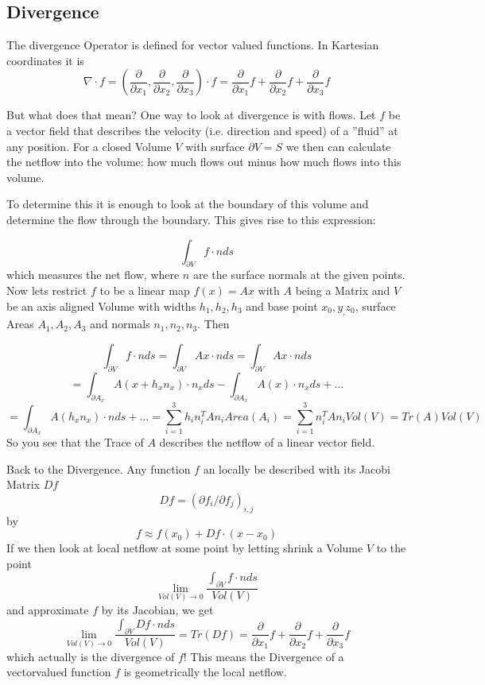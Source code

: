 \subsection{Divergence}

The divergence Operator is defined for vector valued functions. In Kartesian coordinates it is 
\[\nabla \cdot f = (\frac{ \partial}{\partial x_1},\frac{ \partial}{\partial x_2},\frac{ \partial}{\partial x_3})\cdot f = \frac{ \partial}{\partial x_1} f + \frac{ \partial}{\partial x_2}f + \frac{ \partial}{\partial x_3}f\]

But what does that mean? One way to look at divergence is with flows. Let $f$ be a vector field that describes the velocity (i.e. direction and speed) of a ''fluid'' at any position. For a closed Volume $V$ with surface $\partial V = S$ we then can calculate the netflow into the volume: how much flows out minus how much flows into this volume.

To determine this it is enough to look at the boundary of this volume and determine the flow through the boundary. This gives rise to this expression:

\[\int_{\partial V} f \cdot n ds\]
which measures the net flow, where $n$ are the surface normals at the given points. Now lets restrict $f$ to be a linear map $f(x) = A x$ with $A$ being a Matrix and $V$ be an axis aligned Volume with widths $h_1,h_2,h_3$ and base point $x_0,y_,z_0$, surface Areas $A_1, A_2, A_3$ and normals $n_1,n_2,n_3$. Then

\[\int_{\partial V} f \cdot n ds = \int_{\partial V} Ax \cdot n ds = \int_{\partial V} Ax \cdot n ds\]
\[= \int_{\partial A_x} A(x + h_xn_x) \cdot n_x ds - \int_{\partial A_x} A(x) \cdot n_x ds + ...\]
\[= \int_{\partial A_x} A(h_xn_x) \cdot n ds + ... = \sum_{i=1}^3 h_i n_i^TA n_i Area(A_i) = \sum_{i=1}^3 n_i^TA n_i Vol(V) = Tr(A) Vol(V)\]
So you see that the Trace of $A$ describes the netflow of a linear vector field. 

Back to the Divergence. Any function $f$ an locally be described with its Jacobi Matrix $Df$
\[Df = (\partial f_i / \partial f_j)_{i,j}\]
by 
\[f \approx f(x_0) + Df \cdot (x-x_0) \]
If we then look at local netflow at some point by letting shrink a Volume $V$ to the point  
\[\lim_{Vol(V) \rightarrow 0}\frac{\int_{\partial V} f \cdot n ds}{Vol(V)}\]
and approximate $f$ by its Jacobian, we get
\[\lim_{Vol(V) \rightarrow 0}\frac{\int_{\partial V} Df \cdot n ds}{Vol(V)} = Tr(Df)= \frac{ \partial}{\partial x_1} f + \frac{ \partial}{\partial x_2}f + \frac{ \partial}{\partial x_3}f\]
which actually is the divergence of $f$! This means the Divergence of a vectorvalued function $f$ is geometrically the local netflow.

